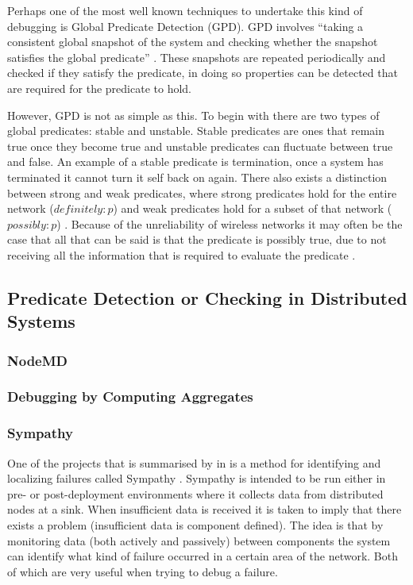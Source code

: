 Perhaps one of the most well known techniques to undertake this kind of debugging is Global Predicate Detection (GPD). GPD involves ``taking a consistent global snapshot of the system and checking whether the snapshot satisfies the global predicate'' \cite{277788}. These snapshots are repeated periodically and checked if they satisfy the predicate, in doing so properties can be detected that are required for the predicate to hold.

However, GPD is not as simple as this. To begin with there are two types of global predicates: stable and unstable. Stable predicates are ones that remain true once they become true \cite{277788} and unstable predicates can fluctuate between true and false. An example of a stable predicate is termination, once a system has terminated it cannot turn it self back on again. There also exists a distinction between strong and weak predicates, where strong predicates hold for the entire network ($definitely : p$) and weak predicates hold for a subset of that network ($possibly : p$) \cite{553309,345831}. Because of the unreliability of wireless networks it may often be the case that all that can be said is that the predicate is possibly true, due to not receiving all the information that is required to evaluate the predicate \cite{?}.


\subsection{Predicate Detection or Checking in Distributed Systems}

\subsubsection*{NodeMD}
\cite{NodeMD}


\subsubsection*{Debugging by Computing Aggregates}
\cite{1203364}

\subsubsection*{Sympathy}

One of the projects that is summarised by \citeauthor{herbert2007adaptive} in \cite{herbert2007adaptive} is a method for identifying and localizing failures called Sympathy \cite{ramanathan2005sympathy}. Sympathy is intended to be run either in pre- or post-deployment environments where it collects data from distributed nodes at a sink. When insufficient data is received it is taken to imply that there exists a problem (insufficient data is component defined). The idea is that by monitoring data (both actively and passively) between components the system can identify what kind of failure occurred in a certain area of the network. Both of which are very useful when trying to debug a failure.

